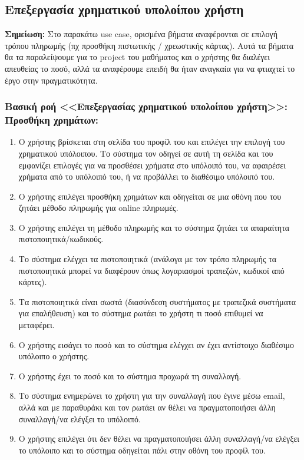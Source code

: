 \documentclass[12pt,a4paper]{article}
\begin{document}
\subsection{Επεξεργασία χρηματικού υπολοίπου χρήστη}

\textbf{Σημείωση: } Στο παρακάτω use case, ορισμένα βήματα αναφέρονται σε επιλογή τρόπου πληρωμής (πχ προσθήκη πιστωτικής / χρεωστικής κάρτας). Αυτά τα βήματα θα τα παραλείψουμε για το project του μαθήματος και ο χρήστης θα διαλέγει απευθείας το ποσό, αλλά τα αναφέρουμε επειδή θα ήταν αναγκαία για να φτιαχτεί το έργο στην πραγματικότητα.

\subsubsection*{Βασική ροή <<Επεξεργασίας χρηματικού υπολοίπου χρήστη>>: Προσθήκη χρημάτων:}
\begin{enumerate}
    \item Ο χρήστης βρίσκεται στη σελίδα του προφίλ του και επιλέγει την επιλογή του χρηματικού υπόλοιπου. Το σύστημα τον οδηγεί σε αυτή τη σελίδα και του εμφανίζει επιλογές για να προσθέσει χρήματα στο υπόλοιπό του, να αφαιρέσει χρήματα από το υπόλοιπό του, ή να προβάλλει το διαθέσιμο υπόλοιπό του.
    \item Ο χρήστης επιλέγει προσθήκη χρημάτων και οδηγείται σε μια οθόνη που του ζητάει μέθοδο πληρωμής για online πληρωμές.
    \item Ο χρήστης επιλέγει τη μέθοδο πληρωμής και το σύστημα ζητάει τα απαραίτητα πιστοποιητικά/κωδικούς.
    \item Το σύστημα ελέγχει τα πιστοποιητικά (ανάλογα με τον τρόπο πληρωμής τα πιστοποιητικά μπορεί να διαφέρουν όπως λογαριασμοί τραπεζών, κωδικοί από κάρτες).
    \item Τα πιστοποιητικά είναι σωστά (διασύνδεση συστήματος με τραπεζικά συστήματα για επαλήθευση) και το σύστημα ρωτάει το χρήστη τι ποσό επιθυμεί να μεταφέρει.
    \item Ο χρήστης εισάγει το ποσό και το σύστημα ελέγχει αν έχει αντίστοιχο διαθέσιμο υπόλοιπο ο χρήστης.
    \item Ο χρήστης έχει το ποσό και το σύστημα προχωρά τη συναλλαγή.
    \item Το σύστημα ενημερώνει το χρήστη για την συναλλαγή που έγινε μέσω email, αλλά και με παραθυράκι και τον ρωτάει αν θέλει να πραγματοποιήσει άλλη συναλλαγή/να ελέγξει το υπόλοιπό.
    \item Ο χρήστης επιλέγει ότι δεν θέλει να πραγματοποιήσει άλλη συναλλαγή/να ελέγξει το υπόλοιπο και το σύστημα οδηγείται πάλι στην οθόνη του προφίλ του.
\end{enumerate}
\end{document}
